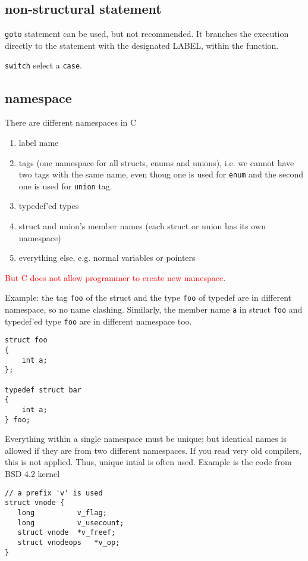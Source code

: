 \subsection{non-structural statement}
\label{sec:goto}

\verb!goto! statement can be used, but not recommended. It branches the
execution directly to the statement with the designated LABEL, within the
function. 

\verb!switch! select a \verb!case!.

\subsection{namespace}
\label{sec:namespace_C}

There are different namespaces in C
\begin{enumerate}
  \item label name 
  
  \item tags (one namespace for all structs, enums and unions), i.e. we cannot
  have two tags with the same name, even thoug one is used for \verb!enum! and
  the second one is used for \verb!union! tag.
  
  \item typedef'ed types
  
  \item struct and union's member names (each struct or union has its own
  namespace)
  
  \item everything else, e.g. normal variables or pointers
\end{enumerate}
\textcolor{red}{But C does not allow programmer to create new namespace}.

Example: the tag \verb!foo! of the struct and the type \verb!foo! of typedef are
in different namespace, so no name clashing. Similarly, the member name \verb!a!
in struct \verb!foo! and typedef'ed type \verb!foo! are in different namespace
too.
\begin{verbatim}
struct foo
{
    int a;
};

typedef struct bar
{
    int a;
} foo;
\end{verbatim}


Everything within a single namespace must be unique; but identical names is
allowed if they are from two different namespaces. If you read very old
compilers, this is not applied. Thus, unique intial is often used. Example is
the code from BSD 4.2 kernel
\begin{verbatim}
// a prefix 'v' is used
struct vnode {
   long          v_flag;
   long          v_usecount;
   struct vnode  *v_freef;
   struct vnodeops   *v_op;
}
\end{verbatim}


